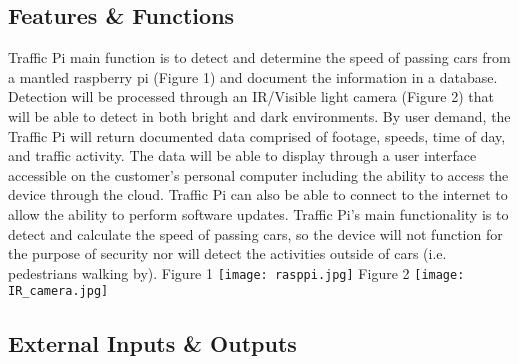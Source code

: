 \subsection{Features \& Functions}
\graphicspath{ {./images/} }
Traffic Pi main function is to detect and determine the speed of passing cars from a mantled raspberry pi (Figure 1) and document the information in a database. Detection will be processed through an IR/Visible light camera (Figure 2) that will be able to detect in both bright and dark environments. By user demand, the Traffic Pi will return documented data comprised of footage, speeds, time of day, and traffic activity. The data will be able to display through a user interface accessible on the customer’s personal computer including the ability to access the device through the cloud. Traffic Pi can also be able to connect to the internet to allow the ability to perform software updates. Traffic Pi’s main functionality is to detect and calculate the speed of passing cars, so the device will not function for the purpose of security nor will detect the activities outside of cars (i.e. pedestrians walking by). \newline\newline
Figure 1\newline
\texttt{[image: rasppi.jpg]}\newline
Figure 2\newline
\texttt{[image: IR\_camera.jpg]}\newline

\subsection{External Inputs \& Outputs}
\begin{table}[h]
\centering
{}
\caption{Overview of External Inputs and Outputs}
\end{table}
